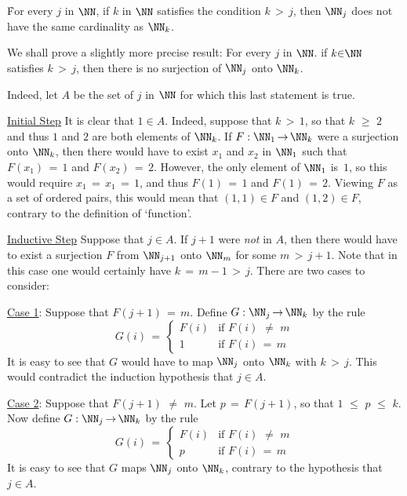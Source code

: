 \V

        \h For every $j$ in ${\NN}$, if $k$ in ${\NN}$ satisfies the condition $k\,>\,j$, then ${\NN}_{j}$ does not have the same cardinality as ${\NN}_{k}$.

\V

\noindent We shall prove a slightly more precise result: For every $j$ in ${\NN}$. if $k{\in}{\NN}$ satisfies $k\,>\,j$,
    then there is no surjection of ${\NN}_{j}$ onto ${\NN}_{k}$.

        Indeed, let $A$ be the set of $j$ in ${\NN}$ for which this last statement is true.


        \underline{Initial Step} It is clear that $1{\in}A$.
    Indeed, suppose that $k\,>\,1$, so that $k\,\,{\geq}\,\,2$ and thus $1$ and $2$ are both elements of ${\NN}_{k}$.
    If $F:{\NN}_{1} \,{\rightarrow}\, {\NN}_{k}$ were a surjection onto ${\NN}_{k}$,
    then there would have to exist $x_{1}$ and $x_{2}$ in ${\NN}_{1}$ such that $F(x_{1}) \,=\, 1$ and $F(x_{2}) \,=\, 2$.
    However, the only element of ${\NN}_{1}$ is~$1$, so this would require $x_{1} \,=\, x_{1} \,=\, 1$, and thus $F(1) \,=\, 1$ and $F(1) \,=\, 2$.
    Viewing $F$ as a set of ordered pairs, this would mean that $(1,1){\in}F$ and $(1,2){\in}F$, contrary to the definition of `function'.

        \underline{Inductive Step} Suppose that $j{\in}A$. If $j+1$ were {\em not} in $A$,
    then there would have to exist a surjection $F$ from ${\NN}_{j+1}$ onto ${\NN}_{m}$ for some $m\,>\,j+1$.
    Note that in this case one would certainly have $k \,=\, m-1\,>\,j$. There are two cases to consider:

        \h \underline{Case 1}: Suppose that $F(j+1) \,=\, m$.
    Define $G:{\NN}_{j} \,{\rightarrow}\, {\NN}_{k}$ by the rule
        \begin{displaymath}
        G(i) \,=\, \left\{
        \begin{array}{cl}
        F(i) & \mbox{if $F(i) \,\,{\neq}\,\, m$} \\
           1 & \mbox{if $F(i) \,=\, m$}
        \end{array}
        \right.
        \end{displaymath}
    It is easy to see that $G$ would have to map ${\NN}_{j}$ onto ${\NN}_{k}$ with $k\,>\,j$.
    This would contradict the induction hypothesis that $j{\in}A$.

        \h \underline{Case 2}: Suppose that $F(j+1) \,\,{\neq}\,\, m$. Let $p \,=\, F(j+1)$, so that $1\,\,{\leq}\,\,p\,\,{\leq}\,\,k$.
    Now define $G:{\NN}_{j} \,{\rightarrow}\, {\NN}_{k}$ by the rule
        \begin{displaymath}
        G(i) \,=\,
        \left\{
        \begin{array}{cl}
        F(i) & \mbox{if $F(i) \,\,{\neq}\,\, m$} \\
          p  & \mbox{if $F(i) \,=\, m$}
        \end{array}
        \right.
        \end{displaymath}
    It is easy to see that $G$ maps ${\NN}_{j}$ onto ${\NN}_{k}$, contrary to the hypothesis that $j{\in}A$.

